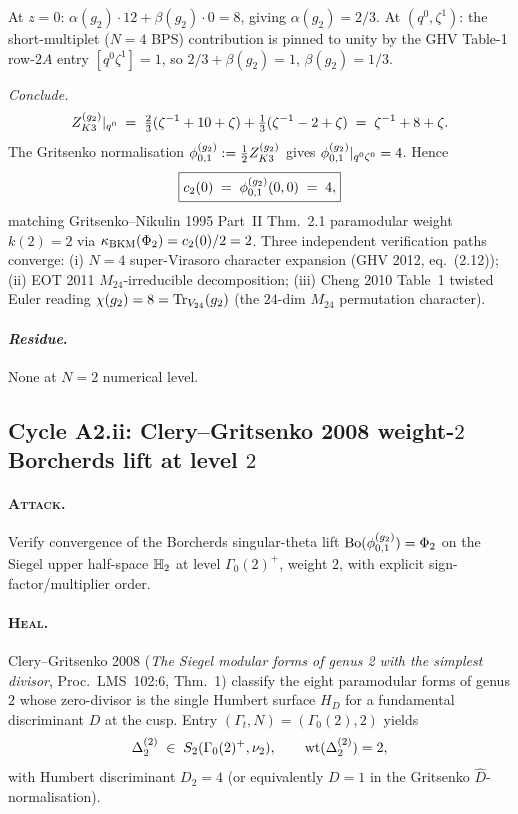 At $z = 0$: $\alpha(g_2)\cdot 12 + \beta(g_2)\cdot 0 = 8$, giving
$\alpha(g_2) = 2/3$. At $(q^0, \zeta^1)$: the short-multiplet
($N{=}4$ BPS) contribution is pinned to unity by the GHV Table-1
row-$2A$ entry $[q^0\zeta^1] = 1$, so $2/3 + \beta(g_2) = 1$,
$\beta(g_2) = 1/3$.

\emph{Conclude.}
\[
  Z^{(g_2)}_{K3}|_{q^0}
  \;=\; \tfrac{2}{3}(\zeta^{-1} + 10 + \zeta)
     + \tfrac{1}{3}(\zeta^{-1} - 2 + \zeta)
  \;=\; \zeta^{-1} + 8 + \zeta.
\]
The Gritsenko normalisation $\phi^{(g_2)}_{0,1} := \tfrac{1}{2}Z^{(g_2)}_{K3}$ gives
$\phi^{(g_2)}_{0,1}|_{q^0\zeta^0} = 4$. Hence
\[
  \boxed{c_2(0) \;=\; \phi^{(g_2)}_{0,1}(0, 0) \;=\; 4,}
\]
matching Gritsenko--Nikulin 1995 Part~II Thm.~2.1 paramodular weight
$k(2) = 2$ via $\kappa_{\mathrm{BKM}}(\Phi_2) = c_2(0)/2 = 2$. Three independent
verification paths converge: (i) $N{=}4$ super-Virasoro character
expansion (GHV 2012, eq.~(2.12)); (ii) EOT 2011 $M_{24}$-irreducible
decomposition; (iii) Cheng 2010 Table~1 twisted Euler reading
$\chi(g_2) = 8 = \operatorname{Tr}_{V_{24}}(g_2)$ (the $24$-dim $M_{24}$ permutation
character).

\paragraph{\emph{Residue}.} None at $N = 2$ numerical level.

\subsection{Cycle A2.ii: Clery--Gritsenko 2008 weight-$2$ Borcherds lift
at level $2$}
\label{subsec:a2-cycle-ii}

\paragraph{\textsc{Attack}.}
Verify convergence of the Borcherds singular-theta lift
$\mathrm{Bo}(\phi^{(g_2)}_{0,1}) = \Phi_2$ on the Siegel upper half-space $\mathbb{H}_2$ at level
$\Gamma_0(2)^+$, weight $2$, with explicit sign-factor/multiplier order.

\paragraph{\textsc{Heal}. \ClaimStatusTheorem}
Clery--Gritsenko 2008 (\emph{The Siegel modular forms of genus 2 with
the simplest divisor}, Proc.~LMS~102:6, Thm.~1) classify the eight
paramodular forms of genus $2$ whose zero-divisor is the single
Humbert surface $H_D$ for a fundamental discriminant $D$ at the cusp.
Entry $(\Gamma_t, N) = (\Gamma_0(2), 2)$ yields
\[
  \Delta_2^{(2)} \;\in\; S_2(\Gamma_0(2)^+, \nu_2),
  \qquad \operatorname{wt}(\Delta_2^{(2)}) = 2,
\]
with Humbert discriminant $D_2 = 4$ (or equivalently $D = 1$ in the
Gritsenko $\hat D$-normalisation).

